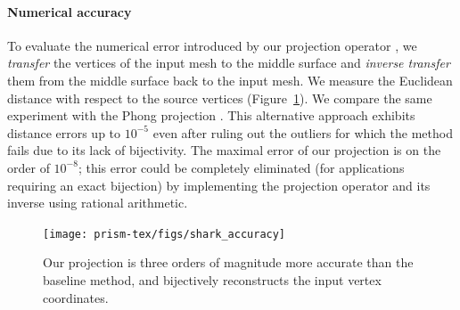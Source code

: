 \paragraph{Numerical accuracy} 
To evaluate the numerical error introduced by  our projection operator , we \emph{transfer} the vertices of the input mesh to the middle surface and \emph{inverse transfer} them from the middle surface back to the input mesh.  We measure the Euclidean distance with respect to the source vertices (Figure~\ref{prism:fig:shark_accuracy}). 
We compare the same experiment with the Phong projection \cite{kobbelt1998interactive}. This alternative approach exhibits distance errors up to $10^{-5}$ even after ruling out the outliers for which the method fails due to its lack of bijectivity.  The maximal error of our projection is on the order of $10^{-8}$; this error could be completely eliminated (for applications requiring an exact bijection) by implementing the projection operator and its inverse using rational arithmetic.
\begin{figure}
    \centering
    \texttt{[image: prism-tex/figs/shark\_accuracy]}
    \caption{Our projection is three orders of magnitude more accurate than the baseline method, and bijectively reconstructs the input vertex coordinates.}
    \label{prism:fig:shark_accuracy}
    
\end{figure}
